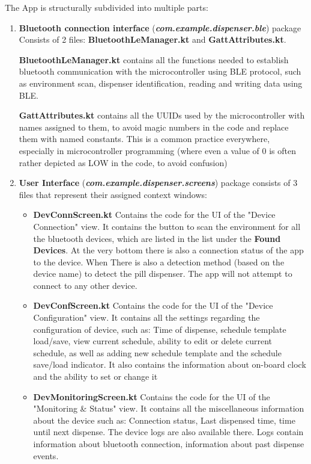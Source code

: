 The App is structurally subdivided into multiple parts: 
\begin{enumerate}
	\item \textbf{Bluetooth connection interface} (\textit{\textbf{com.example.dispenser.ble}}) package Consists of 2 files: \textbf{BluetoothLeManager.kt} and \textbf{GattAttributes.kt}. 
	
	\textbf{BluetoothLeManager.kt} contains all the functions needed to establish bluetooth communication with the microcontroller using \ac{BLE} protocol, such as environment scan, dispenser identification, reading and writing data using \ac{BLE}.
	
	\textbf{GattAttributes.kt} contains all the \ac{UUID}s used by the microcontroller with names assigned to them, to avoid magic numbers in the code and replace them with named constants. This is a common practice everywhere, especially in microcontroller programming (where even a value of 0 is often rather depicted as LOW in the code, to avoid confusion)
	\item \textbf{User Interface} (\textit{\textbf{com.example.dispenser.screens}}) package consists of 3 files that represent their assigned context windows:
	\begin{itemize}
		\item \textbf{DevConnScreen.kt} Contains the code for the UI of the "Device Connection" view. It contains the button to scan the environment for all the bluetooth devices, which are listed in the list under the \textbf{Found Devices}. At the very bottom there is also a connection status of the app to the device. When There is also a detection method (based on the device name) to detect the pill dispenser. The app will not attempt to connect to any other device.

		\item \textbf{DevConfScreen.kt} Contains the code for the UI of the "Device Configuration" view. It contains all the settings regarding the configuration of device, such as: Time of dispense, schedule template load/save, view current schedule, ability to edit or delete current schedule, as well as adding new schedule template and the schedule save/load indicator. It also contains the information about on-board clock and the ability to set or change it
		
		\item \textbf{DevMonitoringScreen.kt} Contains the code for the UI of the "Monitoring \& Status" view. It contains all the miscellaneous information about the device such as: Connection status, Last dispensed time, time until next dispense. The device logs are also available there. Logs contain information about bluetooth connection, information about past dispense events.
		

\end{itemize}
\end{enumerate}
